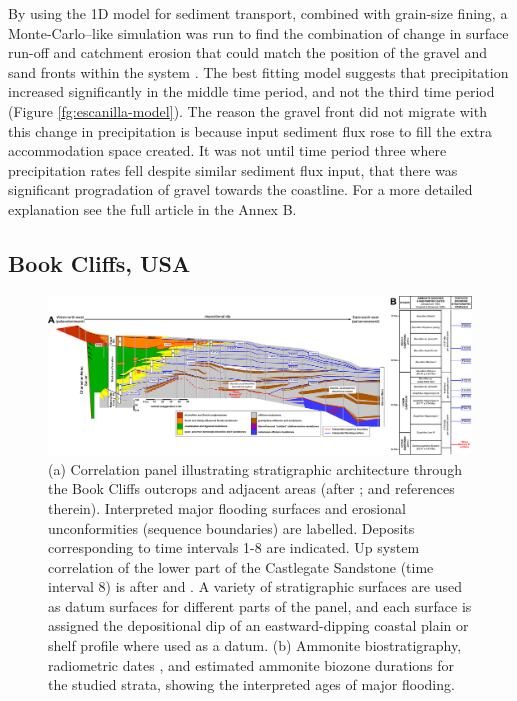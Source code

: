 By using the 1D model for sediment transport, combined with grain-size fining, a Monte-Carlo--like simulation was run to find the combination of change in surface run-off and catchment erosion that could match the position of the gravel and sand fronts within the system \citep{armitage-etal-2015}. The best fitting model suggests that precipitation increased significantly in the middle time period, and not the third time period (Figure \ref{fg:escanilla-model}). The reason the gravel front did not migrate with this change in precipitation is because input sediment flux rose to fill the extra accommodation space created. It was not until time period three where precipitation rates fell despite similar sediment flux input, that there was significant progradation of gravel towards the coastline. For a more detailed explanation see the full article in the Annex B.

\subsection{Book Cliffs, USA}

\begin{figure}
\includegraphics[width=\textwidth]{./figures/ch2-bookcliffs.pdf}
\caption{(a) Correlation panel illustrating stratigraphic architecture through the Book Cliffs outcrops and adjacent areas (after \citealp{horton-etal-2004,hampson-2010,hampson-etal-2014}; and references therein). Interpreted major flooding surfaces and erosional unconformities (sequence boundaries) are labelled. Deposits corresponding to time intervals 1-8 are indicated. Up system correlation of the lower part of the Castlegate Sandstone (time interval 8) is after \cite{robinson-1998} and \cite{mclaurin-2000}. A variety of stratigraphic surfaces are used as datum surfaces for different parts of the panel, and each surface is assigned the depositional dip of an eastward-dipping coastal plain or shelf profile where used as a datum. (b) Ammonite biostratigraphy, radiometric dates \citep{obradovich-1993}, and estimated ammonite biozone durations \citep{krystinik-1995} for the studied strata, showing the interpreted ages of major flooding.}
\label{fg:bookcliffs}
\end{figure}

